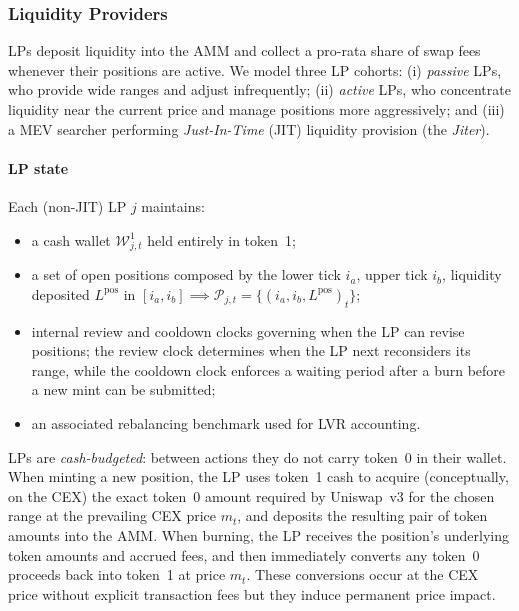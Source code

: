 \documentclass[11pt]{article}
\begin{document}
\subsubsection{Liquidity Providers}
\label{subsec:LPs}

LPs deposit liquidity into the AMM and collect a pro-rata share of swap fees whenever their
positions are active. We model three LP cohorts:
(i) \emph{passive} LPs, who provide wide ranges and adjust infrequently;
(ii) \emph{active} LPs, who concentrate liquidity near the current price and manage positions more
aggressively; and
(iii) a MEV searcher performing \emph{Just-In-Time} (JIT) liquidity provision (the \emph{Jiter}).

\paragraph{LP state}
Each (non-JIT) LP $j$ maintains:
\begin{itemize}[leftmargin=*]
  \item a cash wallet $\mathcal{W}^1_{j,t}$ held entirely in token~1;
  \item a set of open positions composed by the lower tick $i_a$, upper tick $i_b$, liquidity deposited $L^{\mathrm{pos}}$ in $[i_a, i_b] \implies \mathcal{P}_{j,t}=\{(i_a,i_b,L^{\mathrm{pos}})_t\}$;
  \item internal review and cooldown clocks governing when the LP can revise positions; the review clock determines when the LP next reconsiders its range, while the cooldown clock enforces a waiting period after a burn before a new mint can be submitted;
  \item an associated rebalancing benchmark used for LVR accounting.
\end{itemize}
LPs are \emph{cash-budgeted}: between actions they do not carry token~0 in their wallet. When minting a new
position, the LP uses token~1 cash to acquire (conceptually, on the CEX) the exact token~0 amount required by
Uniswap~v3 for the chosen range at the prevailing CEX price $m_t$, and deposits the resulting pair of token
amounts into the AMM. When burning, the LP receives the position's underlying token amounts and accrued fees,
and then immediately converts any token~0 proceeds back into token~1 at price $m_t$. These conversions occur at the 
CEX price without explicit transaction fees but they induce permanent price impact.
\end{document}
